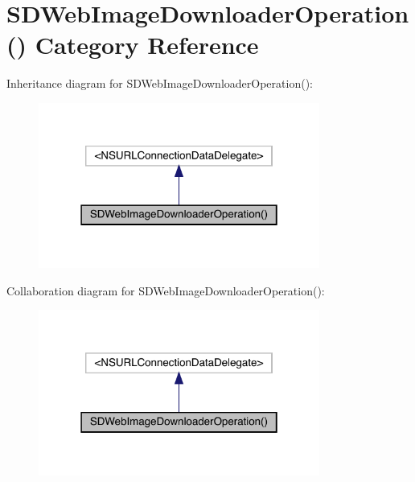 \hypertarget{category_s_d_web_image_downloader_operation_07_08}{}\section{S\+D\+Web\+Image\+Downloader\+Operation() Category Reference}
\label{category_s_d_web_image_downloader_operation_07_08}


Inheritance diagram for S\+D\+Web\+Image\+Downloader\+Operation()\+:\nopagebreak
\begin{figure}[H]
\begin{center}
\leavevmode
\includegraphics[width=262pt]{category_s_d_web_image_downloader_operation_07_08__inherit__graph}
\end{center}
\end{figure}


Collaboration diagram for S\+D\+Web\+Image\+Downloader\+Operation()\+:\nopagebreak
\begin{figure}[H]
\begin{center}
\leavevmode
\includegraphics[width=262pt]{category_s_d_web_image_downloader_operation_07_08__coll__graph}
\end{center}
\end{figure}
